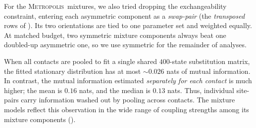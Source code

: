 \documentclass{article}
\newcommand{\Metrop}{\textsc{Metropolis}}
\begin{document}
For the \Metrop\ mixtures, we also tried dropping the exchangeability constraint, 
entering each asymmetric component as a \emph{swap-pair} (the \emph{transposed} rows of ). Its two orientations are tied to one parameter set and weighted equally. 
At matched budget, two symmetric mixture components always beat
one doubled-up asymmetric one, so we use symmetric for the remainder of analyses.

When all contacts are pooled to fit a single shared $400$-state substitution matrix, 
the fitted stationary distribution has at most $\sim 0.026$ nats of mutual
information. In contrast, the mutual information estimated \emph{separately for each contact} 
is much higher; the mean is $0.16$ nats, and the median is $0.13$ nats. 
Thus, individual site-pairs carry information washed out by pooling across contacts. 
The mixture models reflect this observation in the wide range of coupling 
strengths among its mixture components ().
\end{document}
